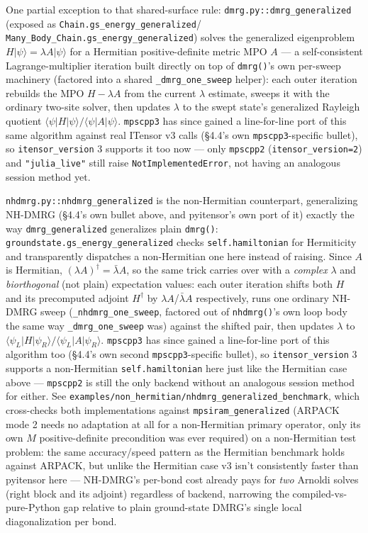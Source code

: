 \documentclass[11pt]{article}
\begin{document}
One partial exception to that shared-surface rule:
\texttt{dmrg.py::dmrg\_generalized} (exposed as
\texttt{Chain.gs\_energy\_generalized}/
\texttt{Many\_Body\_Chain.gs\_energy\_generalized}) solves the generalized
eigenproblem $H|\psi\rangle=\lambda A|\psi\rangle$ for a Hermitian
positive-definite metric MPO $A$ --- a self-consistent Lagrange-multiplier
iteration built directly on top of \texttt{dmrg()}'s own per-sweep
machinery (factored into a shared \texttt{\_dmrg\_one\_sweep} helper):
each outer iteration rebuilds the MPO $H-\lambda A$ from the current
$\lambda$ estimate, sweeps it with the ordinary two-site solver, then
updates $\lambda$ to the swept state's generalized Rayleigh quotient
$\langle\psi|H|\psi\rangle/\langle\psi|A|\psi\rangle$. \texttt{mpscpp3}
has since gained a line-for-line port of this same algorithm against
real ITensor v3 calls (\S4.4's own \texttt{mpscpp3}-specific bullet), so
\texttt{itensor\_version} 3 supports it too now --- only
\texttt{mpscpp2} (\texttt{itensor\_version=2}) and
\texttt{"julia\_live"} still raise \texttt{NotImplementedError}, not
having an analogous session method yet.

\texttt{nhdmrg.py::nhdmrg\_generalized} is the non-Hermitian counterpart,
generalizing NH-DMRG (\S4.4's own bullet above, and pyitensor's own port
of it) exactly the way \texttt{dmrg\_generalized} generalizes plain
\texttt{dmrg()}: \texttt{groundstate.gs\_energy\_generalized} checks
\texttt{self.hamiltonian} for Hermiticity and transparently dispatches a
non-Hermitian one here instead of raising. Since $A$ is Hermitian,
$(\lambda A)^\dagger=\bar\lambda A$, so the same trick carries over with
a \emph{complex} $\lambda$ and \emph{biorthogonal} (not plain)
expectation values: each outer iteration shifts both $H$ and its
precomputed adjoint $H^\dagger$ by $\lambda A$/$\bar\lambda A$
respectively, runs one ordinary NH-DMRG sweep
(\texttt{\_nhdmrg\_one\_sweep}, factored out of \texttt{nhdmrg()}'s own
loop body the same way \texttt{\_dmrg\_one\_sweep} was) against the
shifted pair, then updates $\lambda$ to
$\langle\psi_L|H|\psi_R\rangle/\langle\psi_L|A|\psi_R\rangle$.
\texttt{mpscpp3} has since gained a line-for-line port of this algorithm
too (\S4.4's own second \texttt{mpscpp3}-specific bullet), so
\texttt{itensor\_version} 3 supports a non-Hermitian
\texttt{self.hamiltonian} here just like the Hermitian case above ---
\texttt{mpscpp2} is still the only backend without an analogous session
method for either. See
\texttt{examples/non\_hermitian/nhdmrg\_generalized\_benchmark}, which
cross-checks both implementations against \texttt{mpsiram\_generalized}
(ARPACK mode 2 needs no adaptation at all for a non-Hermitian primary
operator, only its own $M$ positive-definite precondition was ever
required) on a non-Hermitian test problem: the same accuracy/speed
pattern as the Hermitian benchmark holds against ARPACK, but unlike the
Hermitian case v3 isn't consistently faster than pyitensor here ---
NH-DMRG's per-bond cost already pays for \emph{two} Arnoldi solves (right
block and its adjoint) regardless of backend, narrowing the
compiled-vs-pure-Python gap relative to plain ground-state DMRG's single
local diagonalization per bond.
\end{document}
